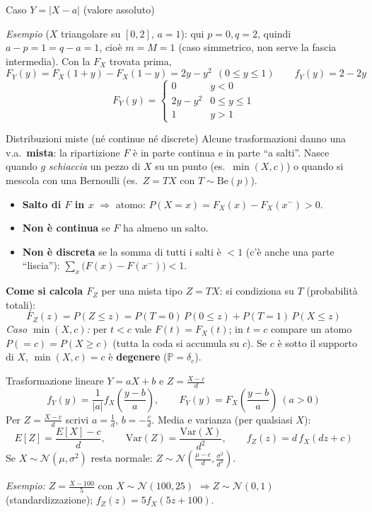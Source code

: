 \documentclass[11pt]{article}
\begin{document}
\begin{concetto}[barGreen]{Caso $Y=|X-a|$ (valore assoluto)}
\begin{enumerate}
\emph{Esempio} ($X$ triangolare su $[0,2]$, $a=1$): qui $p=0,q=2$, quindi $a-p=1=q-a=1$, cio\`e $m=M=1$ (caso simmetrico, non serve la fascia intermedia). Con la $F_X$ trovata prima,
\[ F_Y(y)=F_X(1+y)-F_X(1-y) = 2y - y^2 \ \ (0\le y\le1) \qquad f_Y(y)=2-2y \]
\[ F_Y(y)=\begin{cases} 0 & y<0 \\ 2y-y^2 & 0\le y\le 1 \\ 1 & y>1 \end{cases} \]
\end{enumerate}
\end{concetto}

\begin{concetto}[barGreen]{Distribuzioni miste (n\'e continue n\'e discrete)}
Alcune trasformazioni danno una v.a.\ \textbf{mista}: la ripartizione $F$ \`e in parte continua e in parte ``a salti''. Nasce quando $g$ \emph{schiaccia} un pezzo di $X$ su un punto (es.\ $\min(X,c)$) o quando si mescola con una Bernoulli (es.\ $Z=TX$ con $T\sim\mathrm{Be}(p)$).
\begin{itemize}[leftmargin=1.2em,itemsep=2pt,topsep=2pt]
\item \textbf{Salto di $F$ in $x$} $\Rightarrow$ atomo: $P(X=x)=F_X(x)-F_X(x^-) > 0$.
\item \textbf{Non \`e continua} se $F$ ha almeno un salto.
\item \textbf{Non \`e discreta} se la somma di tutti i salti \`e $<1$ (c'\`e anche una parte ``liscia''): $\sum_x \big(F(x)-F(x^-)\big) < 1$.
\end{itemize}
\textbf{Come si calcola $F_Z$} per una mista tipo $Z=TX$: si condiziona su $T$ (probabilit\`a totali):
\[ F_Z(z)=P(Z\le z)=P(T{=}0)\,P(0\le z) + P(T{=}1)\,P(X\le z) \]
\emph{Caso $\min(X,c)$:} per $t<c$ vale $F(t)=F_X(t)$; in $t=c$ compare un atomo $P(=c)=P(X\ge c)$ (tutta la coda si accumula su $c$). Se $c$ \`e sotto il supporto di $X$, $\min(X,c)=c$ \`e \textbf{degenere} ($\mathbb{P}=\delta_c$).
\end{concetto}

\begin{concetto}[barGreen]{Trasformazione lineare $Y=aX+b$ e $Z=\frac{X-c}{d}$}
\[ f_Y(y) = \frac{1}{|a|}f_X\!\left(\frac{y-b}{a}\right), \qquad F_Y(y)=F_X\!\left(\frac{y-b}{a}\right)\ (a>0) \]
Per $Z=\frac{X-c}{d}$ scrivi $a=\frac1d$, $b=-\frac cd$. Media e varianza (per qualsiasi $X$):
\[ E[Z]=\frac{E[X]-c}{d}, \qquad \mathrm{Var}(Z)=\frac{\mathrm{Var}(X)}{d^2}, \qquad f_Z(z)=d\,f_X(dz+c) \]
Se $X\sim\mathcal{N}(\mu,\sigma^2)$ resta normale: $Z\sim\mathcal{N}\!\left(\frac{\mu-c}{d},\frac{\sigma^2}{d^2}\right)$.

\emph{Esempio:} $Z=\frac{X-100}{5}$ con $X\sim\mathcal{N}(100,25)$ $\Rightarrow Z\sim\mathcal{N}(0,1)$ (standardizzazione); $f_Z(z)=5f_X(5z+100)$.
\end{concetto}
\end{document}
